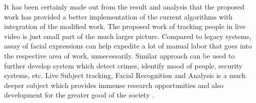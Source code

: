 It has been certainly made out from the result and analysis that 
the proposed work has provided a better implementation of the 
current algorithms with integration of the modified work. The 
proposed work of tracking people in live video is just small 
part of the much larger picture. Compared to legacy systems, 
assay of facial expressions can help expedite a lot of manual 
labor that goes into the respective area of work, unnecessarily. 
Similar approach can be used to further develop system which 
detect crimes, identify mood of people, security systems, etc. 
Live Subject tracking, Facial Recognition and Analysis is a 
much deeper subject which provides immense research 
opportunities and also development for the greater good of the 
society \cite{ReddyLokeJaniDabre2018}.